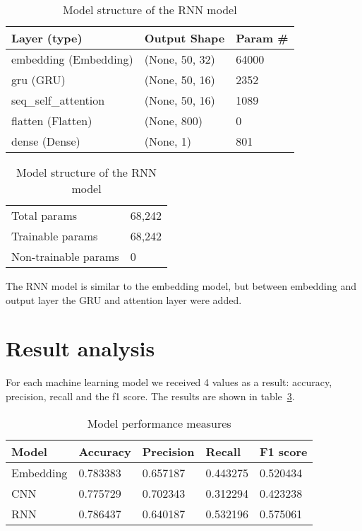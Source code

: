 \documentclass[runningheads]{llncs}
\begin{document}
\begin{table}
\centering
\begin{tabular}{|l|l|l|}
\hline
\rowcolor[HTML]{C0C0C0} 
\textbf{Layer (type)} & \textbf{Output Shape} & \textbf{Param \#} \\ \hline
embedding (Embedding) & (None, 50, 32) & 64000 \\ \hline
gru (GRU) & (None, 50, 16) & 2352 \\ \hline
seq\_self\_attention & (None, 50, 16) & 1089 \\ \hline
flatten (Flatten) & (None, 800) & 0 \\ \hline
dense (Dense) & (None, 1) & 801 \\ \hline
\end{tabular}
\caption{Model structure of the RNN model}
\label{tab:rnn-table}

\begin{tabular}{ll}
Total params & 68,242 \\
Trainable params & 68,242 \\
Non-trainable params & 0
\end{tabular}
\end{table}

The RNN model is similar to the embedding model, but between embedding and output layer the GRU and attention layer were added.


\section{Result analysis}\label{chapter:results}
For each machine learning model we received 4 values as a result: accuracy, precision, recall and the f1 score. The results are shown in table~\ref{tab:model-results}.

\begin{table}[]
\centering
\begin{tabular}{|l|l|l|l|l|}
\hline
\rowcolor[HTML]{C0C0C0} 
\textbf{Model} & \textbf{Accuracy} & \textbf{Precision} & \textbf{Recall} & \textbf{F1 score} \\ \hline
Embedding & 0.783383 & 0.657187 & 0.443275 & 0.520434 \\ \hline
CNN & 0.775729 & 0.702343 & 0.312294 & 0.423238 \\ \hline
RNN & 0.786437 & 0.640187 & 0.532196 & 0.575061 \\ \hline
\end{tabular}
\caption{Model performance measures}
\label{tab:model-results}
\end{table}
\end{document}
